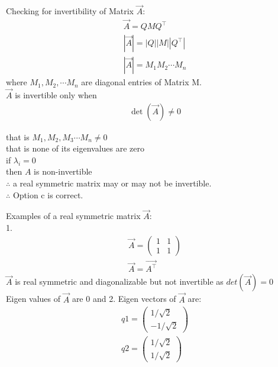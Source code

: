 \documentclass{beamer}
\begin{document}
\begin{frame}
Checking for invertibility of Matrix  $\vec{A}$:
\begin{align}
\vec{A} = Q M Q^\top \\|\vec{A}| = |Q| |M| |Q^\top|\\
|\vec{A}| = M_1 M_2 \cdots M_n
\end{align}
where $M_1, M_2, \cdots M_n$ are diagonal entries of Matrix M.\\
$\vec{A}$ is invertible only when 
\begin{align}
\det(\vec{A}) \neq 0 
\end{align}
\end{frame}
\begin{frame}
that is $M_1, M_2, M_3 \cdots M_n \neq 0$ \\
that is none of its eigenvalues are zero \\

if $\lambda_i = 0$ \\
then $A$ is non-invertible \\

$\therefore$ a real symmetric matrix may or may not be invertible.\\
$\therefore$ Option c is correct.
\end{frame}
\begin{frame}
Examples of a real symmetric matrix $\vec{A}$:\\
1.
\begin{align}
    \vec{A}=\begin{pmatrix}
        1 & 1\\1& 1
    \end{pmatrix}\\
    \vec{A}=\vec{A^\top}
\end{align}
$\vec{A}$ is real symmetric and diagonalizable but not invertible as $det(\vec{A})=0$\\
Eigen values of $\vec{A}$ are 0 and 2.
Eigen vectors of $\vec{A}$ are:
\begin{align}
    q1=\begin{pmatrix}
        1/\sqrt2\\-1/\sqrt2
    \end{pmatrix}\\
    q2=\begin{pmatrix}
        1/\sqrt2\\1/\sqrt2
    \end{pmatrix}
\end{align}
\end{frame}
\end{document}
